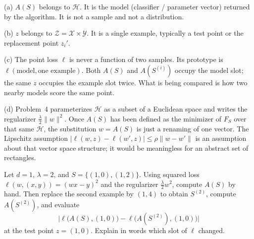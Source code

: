 \begin{solution}
(a) $A(S)$ belongs to $\mathcal{H}$. It is the model (classifier / parameter vector) returned by the algorithm. It is not a sample and not a distribution.

(b) $z$ belongs to $\mathcal{Z}=\mathcal{X}\times\mathcal{Y}$. It is a single example, typically a test point or the replacement point $z_i'$.

(c) The point loss $\ell$ is never a function of two samples. Its prototype is $\ell(\text{model},\text{one example})$. Both $A(S)$ and $A(S^{(i)})$ occupy the model slot; the same $z$ occupies the example slot twice. What is being compared is how two nearby models score the same point.

(d) Problem~4 parameterizes $\mathcal{H}$ as a subset of a Euclidean space and writes the regularizer $\tfrac{\lambda}{2}\lVert w\rVert^2$. Once $A(S)$ has been defined as the minimizer of $F_S$ over that same $\mathcal{H}$, the substitution $w=A(S)$ is just a renaming of one vector. The Lipschitz assumption $\lvert\ell(w,z)-\ell(w',z)\rvert\le\rho\lVert w-w'\rVert$ is an assumption about that vector space structure; it would be meaningless for an abstract set of rectangles.
\end{solution}

\begin{exercise}
\label{ex:mlu-ridge-num}
Let $d=1$, $\lambda=2$, and $S=\{(1,0),(1,2)\}$. Using squared loss $\ell(w,(x,y))=(wx-y)^2$ and the regularizer $\tfrac{\lambda}{2}w^2$, compute $A(S)$ by hand. Then replace the second example by $(1,4)$ to obtain $S^{(2)}$, compute $A(S^{(2)})$, and evaluate
\[
\bigl\lvert\ell\bigl(A(S),(1,0)\bigr)-\ell\bigl(A(S^{(2)}),(1,0)\bigr)\bigr\rvert
\]
at the test point $z=(1,0)$. Explain in words which slot of $\ell$ changed.
\end{exercise}


